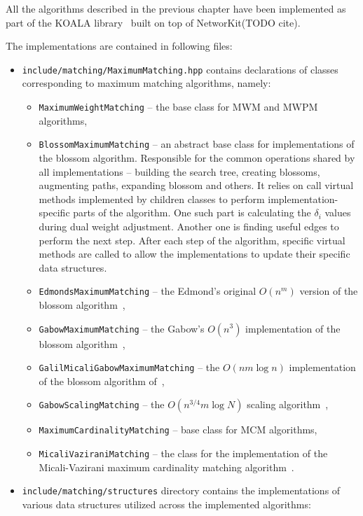 All the algorithms described in the previous chapter have been implemented as part of the KOALA library~\cite{koala-networkit} built on top of NetworKit(TODO cite). 

The implementations are contained in following files:

\begin{itemize}
    \item \texttt{include/matching/MaximumMatching.hpp} contains declarations of classes corresponding to maximum matching algorithms, namely: \begin{itemize}
        \item \texttt{MaximumWeightMatching} – the base class for \textsc{MWM} and \textsc{MWPM} algorithms,
        \item \texttt{BlossomMaximumMatching} – an abstract base class for implementations of the blossom algorithm. Responsible for the common operations shared by all implementations – building the search tree, creating blossoms, augmenting paths, expanding blossom and others. It relies on call virtual methods implemented by children classes to perform implementation-specific parts of the algorithm. One such part is calculating the $\delta_i$ values during dual weight adjustment. Another one is finding useful edges to perform the next step. After each step of the algorithm, specific virtual methods are called to allow the implementations to update their specific data structures.
        \item \texttt{EdmondsMaximumMatching} – the Edmond's original $O(n^m)$ version of the blossom algorithm~\cite{edmonds1965maximum},
        \item \texttt{GabowMaximumMatching} – the Gabow's $O(n^3)$ implementation of the blossom algorithm~\cite{gabow1974implementation},
        \item \texttt{GalilMicaliGabowMaximumMatching} – the $O(nm\log n)$ implementation of the blossom algorithm of~\cite{galil1986ev},
        \item \texttt{GabowScalingMatching} – the $O(n^{3/4}m\log N)$ scaling algorithm~\cite{gabow1984scaling},
        \item \texttt{MaximumCardinalityMatching} – base class for \textsc{MCM} algorithms,
        \item \texttt{MicaliVaziraniMatching} – the class for the implementation of the Micali-Vazirani maximum cardinality matching algorithm~\cite{micali1980v}.
    \end{itemize}
    \item \texttt{include/matching/structures} directory contains the implementations of various data structures utilized across the implemented algorithms: \begin{itemize}

\end{itemize}
\end{itemize}
